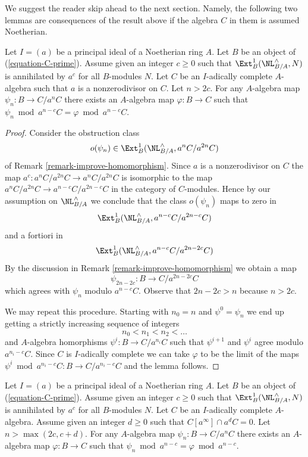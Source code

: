 \noindent
We suggest the reader skip ahead to the next section. Namely, the following
two lemmas are consequences of the result above if the algebra $C$ in them
is assumed Noetherian.

\begin{lemma}
\label{lemma-get-morphism-nonzerodivisor}
Let $I = (a)$ be a principal ideal of a Noetherian ring $A$.
Let $B$ be an object of (\ref{equation-C-prime}).
Assume given an integer $c \geq 0$ such that $\Ext^1_B(\NL_{B/A}^\wedge, N)$
is annihilated by $a^c$ for all $B$-modules $N$.
Let $C$ be an $I$-adically complete $A$-algebra such that
$a$ is a nonzerodivisor on $C$. Let $n > 2c$. For any $A$-algebra
map $\psi_n : B \to C/a^nC$ there exists an $A$-algebra
map $\varphi : B \to C$ such that
$\psi_n \bmod a^{n - c}C = \varphi \bmod a^{n - c}C$.
\end{lemma}

\begin{proof}
Consider the obstruction class
$$
o(\psi_n) \in \Ext^1_B(\NL_{B/A}^\wedge, a^nC/a^{2n}C)
$$
of Remark \ref{remark-improve-homomorphism}. Since $a$ is a nonzerodivisor
on $C$ the map $a^c : a^nC/a^{2n}C \to a^nC/a^{2n}C$ is isomorphic to the
map $a^nC/a^{2n}C \to a^{n - c}C/a^{2n - c}C$ in the category of $C$-modules.
Hence by our assumption on $\NL_{B/A}^\wedge$
we conclude that the class $o(\psi_n)$ maps to zero in
$$
\Ext^1_B(\NL_{B/A}^\wedge, a^{n - c}C/a^{2n - c}C)
$$
and a fortiori in
$$
\Ext^1_B(\NL_{B/A}^\wedge, a^{n - c}C/a^{2n - 2c}C)
$$
By the discussion in Remark \ref{remark-improve-homomorphism} we obtain a map
$$
\psi_{2n - 2c} : B \to C/a^{2n - 2c}C
$$
which agrees with $\psi_n$ modulo $a^{n - c}C$.
Observe that $2n - 2c > n$ because $n > 2c$.

\medskip\noindent
We may repeat this procedure. Starting with $n_0 = n$ and
$\psi^0 = \psi_n$ we end up getting a strictly increasing
sequence of integers
$$
n_0 < n_1 < n_2 < \ldots
$$
and $A$-algebra homorphisms $\psi^i : B \to C/a^{n_i}C$
such that $\psi^{i + 1}$ and $\psi^i$ agree modulo $a^{n_i - c}C$.
Since $C$ is $I$-adically complete we can take $\varphi$
to be the limit of the maps
$\psi^i \bmod a^{n_i - c}C : B \to C/a^{n_i - c}C$
and the lemma follows.
\end{proof}

\begin{lemma}
\label{lemma-get-morphism-principal}
Let $I = (a)$ be a principal ideal of a Noetherian ring $A$.
Let $B$ be an object of (\ref{equation-C-prime}).
Assume given an integer $c \geq 0$ such that $\Ext^1_B(\NL_{B/A}^\wedge, N)$
is annihilated by $a^c$ for all $B$-modules $N$.
Let $C$ be an $I$-adically complete $A$-algebra.
Assume given an integer $d \geq 0$ such that $C[a^\infty] \cap a^dC = 0$.
Let $n > \max(2c, c + d)$. For any $A$-algebra map
$\psi_n : B \to C/a^nC$ there exists an $A$-algebra map
$\varphi : B \to C$ such
that $\psi_n \bmod a^{n - c} = \varphi \bmod a^{n - c}$.
\end{lemma}

